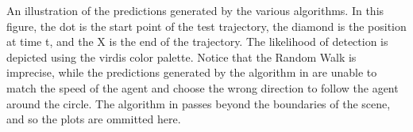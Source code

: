 \documentclass[usenames,dvipsnames]{article}
\providecommand{\response}[1]{
\noindent
\noindent\colorbox{gray!20}{
\parbox{\textwidth}{
\setlength{\parskip}{.1in}
\setlength{\parindent}{.1in}
#1}
}
}
\begin{document}
\begin{enumerate}
\begin{item}
\reversemarginpar{}
\response{An illustration of the predictions generated by the various algorithms. In this figure, the dot is the start point of the test trajectory, the diamond is the position at time t, and the X is the end of the trajectory. The likelihood of detection is depicted using the virdis color palette. Notice that the Random Walk is imprecise, while the predictions generated by the algorithm in \cite{Kitani2012} are unable to match the speed of the agent and choose the wrong direction to follow the agent around the circle. The algorithm in \cite{Alahi2016} passes beyond the boundaries of the scene, and so the plots are ommitted here.}

\end{item}

\end{enumerate}
\end{document}
